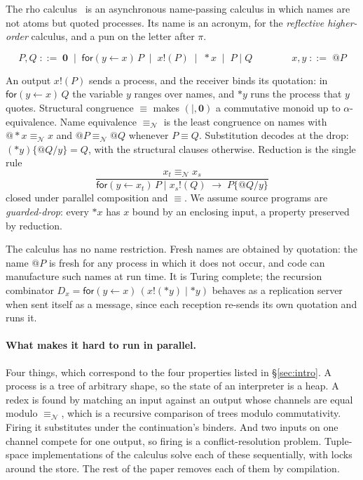 \documentclass[acmsmall,screen,review,anonymous]{acmart}
\makeatletter
\newcommand{\quo}[1]{@#1}
\newcommand{\drp}[1]{{*}#1}
\newcommand{\inp}[3]{\mathsf{for}(#1 \leftarrow #2)\,#3}
\newcommand{\out}[2]{#1!(#2)}
\newcommand{\nil}{\mathbf{0}}
\newcommand{\nameq}{\equiv_{\mathcal{N}}}
\newcommand{\red}{\longrightarrow}
\newcommand{\scong}{\equiv}
\makeatother
\begin{document}
The rho calculus~\cite{MeredithRadestock05} is an asynchronous name-passing
calculus in which names are not atoms but quoted processes. Its name is an
acronym, for the \emph{reflective higher-order} calculus, and a pun on the
letter after $\pi$.

\begin{definition}[Syntax]
\[
  P,Q \;::=\; \nil \;\mid\; \inp{y}{x}{P} \;\mid\; \out{x}{P}
        \;\mid\; \drp{x} \;\mid\; P \mid Q
  \qquad\qquad
  x,y \;::=\; \quo{P}
\]
\end{definition}

An output $\out{x}{P}$ sends a process, and the receiver binds its
quotation: in $\inp{y}{x}{Q}$ the variable $y$ ranges over names, and
$\drp{y}$ runs the process that $y$ quotes. Structural congruence $\scong$
makes $(\mid,\nil)$ a commutative monoid up to $\alpha$-equivalence. Name
equivalence $\nameq$ is the least congruence on names with
$\quo{\drp{x}} \nameq x$ and $\quo{P} \nameq \quo{Q}$ whenever $P \scong Q$.
Substitution decodes at the drop:
$(\drp{y})\{\quo{Q}/y\} = Q$, with the structural clauses otherwise.
Reduction is the single rule
\[
  \frac{x_{t} \nameq x_{s}}
       {\inp{y}{x_{t}}{P} \mid \out{x_{s}}{Q} \;\red\; P\{\quo{Q}/y\}}
\]
closed under parallel composition and $\scong$. We assume source programs are
\emph{guarded-drop}: every $\drp{x}$ has $x$ bound by an enclosing input, a
property preserved by reduction.

The calculus has no name restriction. Fresh names are obtained by quotation:
the name $\quo{P}$ is fresh for any process in which it does not occur, and
code can manufacture such names at run time. It is Turing complete; the
recursion combinator $D_{x} = \inp{y}{x}{(\out{x}{\drp{y}} \mid \drp{y})}$
behaves as a replication server when sent itself as a message, since each
reception re-sends its own quotation and runs it.

\paragraph{What makes it hard to run in parallel.}
Four things, which correspond to the four properties listed in
\S\ref{sec:intro}. A process is a tree of arbitrary shape, so the state of an
interpreter is a heap. A redex is found by matching an input against an
output whose channels are equal modulo $\nameq$, which is a recursive
comparison of trees modulo commutativity. Firing it substitutes under the
continuation's binders. And two inputs on one channel compete for one output,
so firing is a conflict-resolution problem. Tuple-space implementations of
the calculus solve each of these sequentially, with locks around the store.
The rest of the paper removes each of them by compilation.
\end{document}
